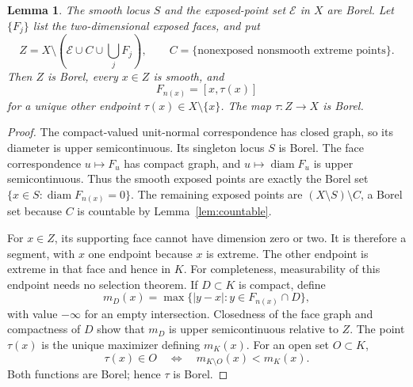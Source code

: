 \documentclass[11pt,letterpaper]{amsart}
\newtheorem{lemma}[theorem]{Lemma}
\theoremstyle{definition}
\theoremstyle{remark}
\numberwithin{equation}{section}
\DeclareMathOperator{\diam}{diam}
\begin{document}
\begin{lemma}\label{lem:measurable}
The smooth locus $S$ and the exposed-point set $\mathcal E$ in $X$ are
Borel. Let $\{F_j\}$ list the two-dimensional exposed faces, and put
\[
 Z=X\setminus\left(\mathcal E\cup C\cup\bigcup_j F_j\right),
 \qquad C=\{\text{nonexposed nonsmooth extreme points}\}.
\]
Then $Z$ is Borel, every $x\in Z$ is smooth, and
\[
                     F_{n(x)}=[x,\tau(x)]
\]
for a unique other endpoint $\tau(x)\in X\setminus\{x\}$. The map
$\tau:Z\to X$ is Borel.
\end{lemma}
\begin{proof}
The compact-valued unit-normal correspondence has closed graph, so its
diameter is upper semicontinuous. Its singleton locus $S$ is Borel.
The face correspondence $u\mapsto F_u$ has compact graph, and
$u\mapsto\diam F_u$ is upper semicontinuous. Thus the smooth exposed
points are exactly the Borel set
$\{x\in S:\diam F_{n(x)}=0\}$. The remaining exposed points are
$(X\setminus S)\setminus C$, a Borel set because $C$ is countable by
Lemma~\ref{lem:countable}.

For $x\in Z$, its supporting face cannot have dimension zero or two.
It is therefore a segment, with $x$ one endpoint because $x$ is extreme.
The other endpoint is extreme in that face and hence in $K$.
For completeness, measurability of this endpoint needs no selection
theorem. If $D\subset K$ is compact, define
\[
m_D(x)=\max\{|y-x|:y\in F_{n(x)}\cap D\},
\]
with value $-\infty$ for an empty intersection. Closedness of the face
graph and compactness of $D$ show that $m_D$ is upper semicontinuous
relative to $Z$. The point $\tau(x)$ is the unique maximizer defining
$m_K(x)$. For an open set $O\subset K$,
\[
                  \tau(x)\in O
          \quad\Longleftrightarrow\quad m_{K\setminus O}(x)<m_K(x).
\]
Both functions are Borel; hence $\tau$ is Borel.
\end{proof}
\end{document}
